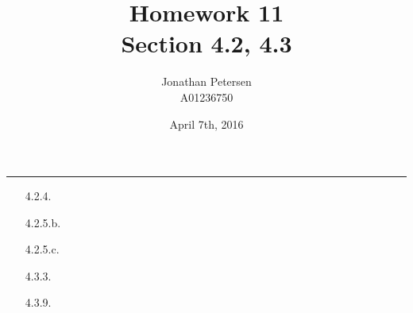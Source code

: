 \documentclass{article}
\title{Homework 11 \\ Section 4.2, 4.3}
\author{Jonathan Petersen \\ A01236750}
\date{April 7th, 2016}
\begin{document}
	\maketitle
	\hrule 
	\vspace{5mm}
	\begin{enumerate}
		\item [4.2.4.]

		\item [4.2.5.b.]

		\item [4.2.5.c.]

		\item [4.3.3.]

		\item [4.3.9.]

	\end{enumerate}
\end{document}
